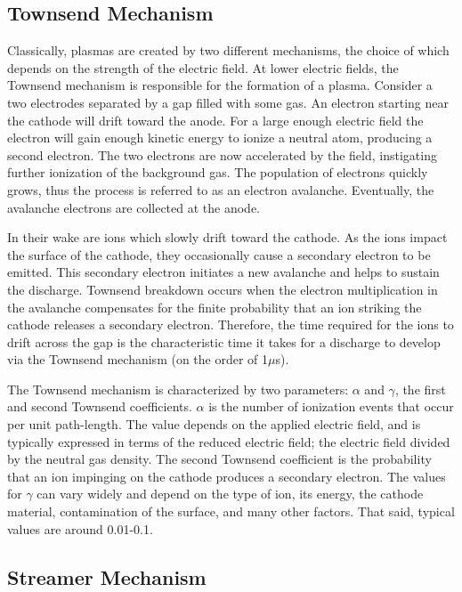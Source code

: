 \subsection{Townsend Mechanism}

Classically, plasmas are created by two different mechanisms, the choice of
which depends on the strength of the electric field. At lower electric fields,
the Townsend mechanism is responsible for the formation of a plasma. Consider a
two electrodes separated by a gap filled with some gas. An electron starting
near the cathode will drift toward the anode. For a large enough electric field
the electron will gain enough kinetic energy to ionize a neutral atom, producing
a second electron. The two electrons are now accelerated by the field,
instigating further ionization of the background gas. The population of
electrons quickly grows, thus the process is referred to as an electron
avalanche. Eventually, the avalanche electrons are collected at the anode.

In their wake are ions which slowly drift toward the cathode. As the ions impact
the surface of the cathode, they occasionally cause a secondary electron to be
emitted. This secondary electron initiates a new avalanche and helps to sustain
the discharge. Townsend breakdown occurs when the electron multiplication in the
avalanche compensates for the finite probability that an ion striking the
cathode releases a secondary electron. Therefore, the time required for the ions
to drift across the gap is the characteristic time it takes for a discharge to
develop via the Townsend mechanism (on the order of 1$\mu$s).

The Townsend mechanism is characterized by two parameters: $\alpha$ and
$\gamma$, the first and second Townsend coefficients. $\alpha$ is the number of
ionization events that occur per unit path-length. The value depends on the
applied electric field, and is typically expressed in terms of the reduced
electric field; the electric field divided by the neutral gas density. The
second Townsend coefficient is the probability that an ion impinging on the
cathode produces a secondary electron. The values for $\gamma$ can vary widely
and depend on the type of ion, its energy, the cathode material, contamination
of the surface, and many other factors. That said, typical values are around
0.01-0.1.

\subsection{Streamer Mechanism}

